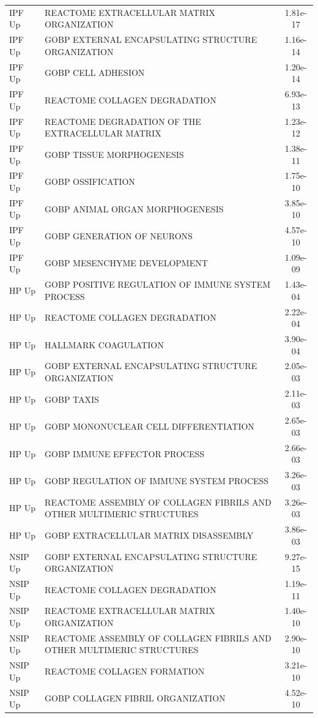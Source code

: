 \documentclass[
]{article}
\begin{document}
\begin{singlespace}
\begin{longtable}[t]{>{\raggedright\arraybackslash}p{1.0in}>{\raggedright\arraybackslash}p{4.5in}c}
\endfoot
\bottomrule
\endlastfoot
IPF Up & REACTOME EXTRACELLULAR MATRIX ORGANIZATION & 1.81e-17\\
IPF Up & GOBP EXTERNAL ENCAPSULATING STRUCTURE ORGANIZATION & 1.16e-14\\
IPF Up & GOBP CELL ADHESION & 1.20e-14\\
IPF Up & REACTOME COLLAGEN DEGRADATION & 6.93e-13\\
IPF Up & REACTOME DEGRADATION OF THE EXTRACELLULAR MATRIX & 1.23e-12\\
\addlinespace
IPF Up & GOBP TISSUE MORPHOGENESIS & 1.38e-11\\
IPF Up & GOBP OSSIFICATION & 1.75e-10\\
IPF Up & GOBP ANIMAL ORGAN MORPHOGENESIS & 3.85e-10\\
IPF Up & GOBP GENERATION OF NEURONS & 4.57e-10\\
IPF Up & GOBP MESENCHYME DEVELOPMENT & 1.09e-09\\
\addlinespace
HP Up & GOBP POSITIVE REGULATION OF IMMUNE SYSTEM PROCESS & 1.43e-04\\
HP Up & REACTOME COLLAGEN DEGRADATION & 2.22e-04\\
HP Up & HALLMARK COAGULATION & 3.90e-04\\
HP Up & GOBP EXTERNAL ENCAPSULATING STRUCTURE ORGANIZATION & 2.05e-03\\
HP Up & GOBP TAXIS & 2.11e-03\\
\addlinespace
HP Up & GOBP MONONUCLEAR CELL DIFFERENTIATION & 2.65e-03\\
HP Up & GOBP IMMUNE EFFECTOR PROCESS & 2.66e-03\\
HP Up & GOBP REGULATION OF IMMUNE SYSTEM PROCESS & 3.26e-03\\
HP Up & REACTOME ASSEMBLY OF COLLAGEN FIBRILS AND OTHER MULTIMERIC STRUCTURES & 3.26e-03\\
HP Up & GOBP EXTRACELLULAR MATRIX DISASSEMBLY & 3.86e-03\\
\addlinespace
NSIP Up & GOBP EXTERNAL ENCAPSULATING STRUCTURE ORGANIZATION & 9.27e-15\\
NSIP Up & REACTOME COLLAGEN DEGRADATION & 1.19e-11\\
NSIP Up & REACTOME EXTRACELLULAR MATRIX ORGANIZATION & 1.40e-10\\
NSIP Up & REACTOME ASSEMBLY OF COLLAGEN FIBRILS AND OTHER MULTIMERIC STRUCTURES & 2.90e-10\\
NSIP Up & REACTOME COLLAGEN FORMATION & 3.21e-10\\
\addlinespace
NSIP Up & GOBP COLLAGEN FIBRIL ORGANIZATION & 4.52e-10\\

\end{longtable}
\end{singlespace}
\end{document}
